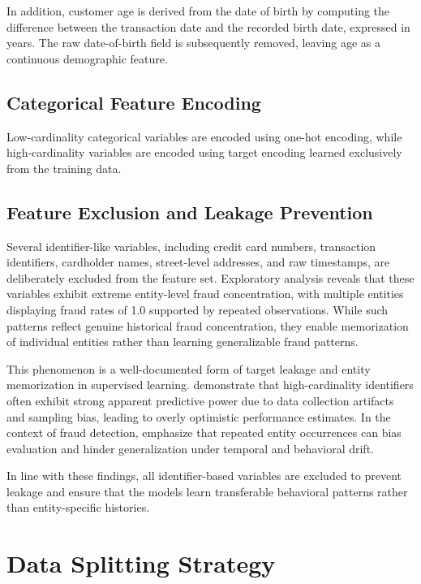 \documentclass[oneside,12pt,parskip=half,american,numbers=noenddot]{scrreprt}
\begin{document}
In addition, customer age is derived from the date of birth by computing the difference between the transaction date and the recorded birth date, expressed in years. The raw date-of-birth field is subsequently removed, leaving age as a continuous demographic feature.


\subsection{Categorical Feature Encoding}
Low-cardinality categorical variables are encoded using one-hot encoding, while high-cardinality variables are encoded using target encoding learned exclusively from the training data.

\subsection{Feature Exclusion and Leakage Prevention}
\label{sec:feature_exclusion}

Several identifier-like variables, including credit card numbers, transaction identifiers, cardholder names, street-level addresses, and raw timestamps, are deliberately excluded from the feature set. Exploratory analysis reveals that these variables exhibit extreme entity-level fraud concentration, with multiple entities displaying fraud rates of 1.0 supported by repeated observations. While such patterns reflect genuine historical fraud concentration, they enable memorization of individual entities rather than learning generalizable fraud patterns.

This phenomenon is a well-documented form of target leakage and entity memorization in supervised learning. \textcite{kaufman_leakage_2012} demonstrate that high-cardinality identifiers often exhibit strong apparent predictive power due to data collection artifacts and sampling bias, leading to overly optimistic performance estimates. In the context of fraud detection, \textcite{dal_pozzolo_credit_2015} emphasize that repeated entity occurrences can bias evaluation and hinder generalization under temporal and behavioral drift.

In line with these findings, all identifier-based variables are excluded to prevent leakage and ensure that the models learn transferable behavioral patterns rather than entity-specific histories.

\section{Data Splitting Strategy}
\label{sec:data_split}
\end{document}
